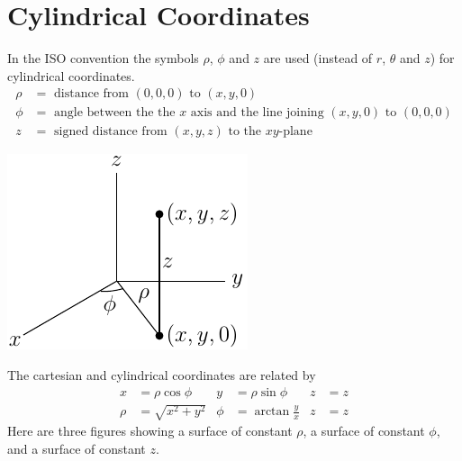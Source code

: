 \section{Cylindrical Coordinates}\label{ap:ISOcylCoord}
In the ISO convention the symbols $\rho$, $\phi$ and $z$ are used 
(instead of $r$, $\theta$ and $z$) for cylindrical coordinates.
\begin{align*}
\rho&=\text{ distance from }(0,0,0)\text{ to }(x,y,0)\\
\phi&=\text{ angle between the the $x$ axis and the line joining $(x,y,0)$ to $(0,0,0)$}\\
z&=\text{ signed distance from }(x,y,z)
\text{ to the $xy$-plane}
\end{align*}
\begin{efig}
\begin{center}
    \includegraphics{cyl1.pdf}
\end{center}
\end{efig}
The cartesian and cylindrical coordinates
are related by
\begin{align*}
x&=\rho\cos\phi &
y&=\rho\sin\phi &
z&=z \\
    \rho&=\sqrt{x^2+y^2} &
    \phi&=\arctan\frac{y}{x} &
    z&=z
\end{align*}
Here are three figures showing a surface of constant $\rho$,
a surface of constant $\phi$, and a surface of constant $z$.
